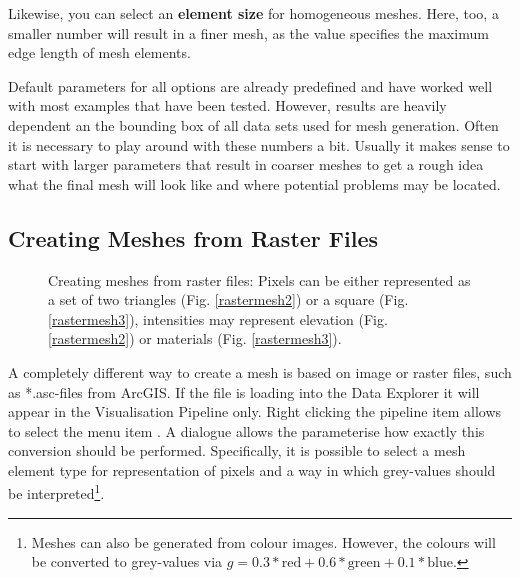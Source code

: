 Likewise, you can select an \textbf{element size} for homogeneous meshes. Here, too, a smaller number will result in a finer mesh, as the value specifies the maximum edge length of mesh elements.

\bigskip

Default parameters for all options are already predefined and have worked well with most examples that have been tested. However, results are heavily dependent an the bounding box of all data sets used for mesh generation. Often it is necessary to play around with these numbers a bit. Usually it makes sense to start with larger parameters that result in coarser meshes to get a rough idea what the final mesh will look like and where potential problems may be located.

\subsection{Creating Meshes from Raster Files}
\label{meshraster}

\begin{figure}[tb]
\begin{center}
\enspace
{}\enspace
{}
\end{center}
\caption{Creating meshes from raster files: Pixels can be either represented as a set of two triangles (Fig. \ref{rastermesh2}) or a square (Fig. \ref{rastermesh3}), intensities may represent elevation (Fig. \ref{rastermesh2}) or materials (Fig. \ref{rastermesh3}).}
\label{fig:rastermesh}
\end{figure}

A completely different way to create a mesh is based on image or raster files, such as *.asc-files from ArcGIS. If the file is loading into the Data Explorer it will appear in the Visualisation Pipeline only. Right clicking the pipeline item allows to select the menu item . A dialogue allows the parameterise how exactly this conversion should be performed. Specifically, it is possible to select a mesh element type for representation of pixels and a way in which grey-values should be interpreted\footnote{Meshes can also be generated from colour images. However, the colours will be converted to grey-values via $g = 0.3*\text{red}+0.6*\text{green}+0.1*\text{blue}$.}.

